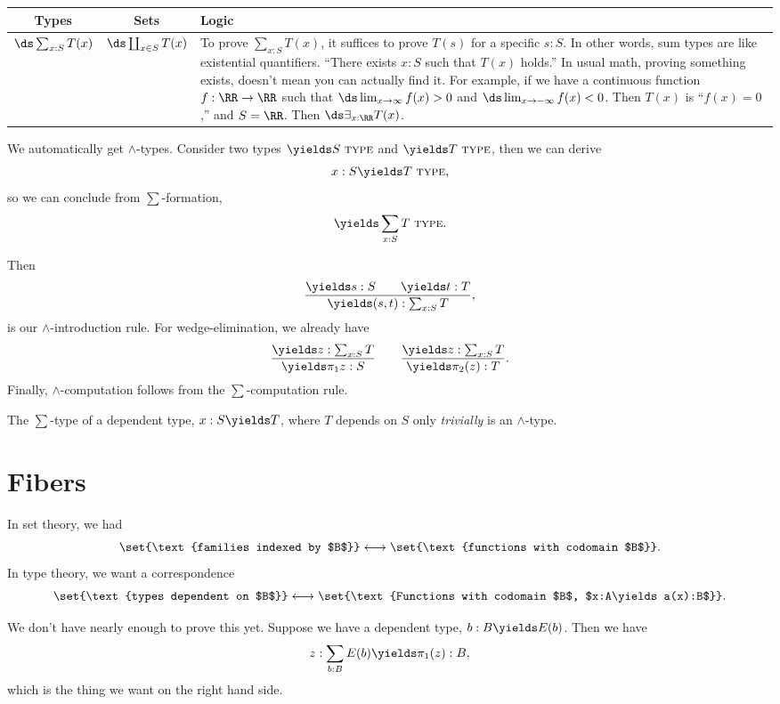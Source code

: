 \documentclass{article}
\newcommand\TYPE{\text{ \scshape{type}}}
\begin{document}
\begin{table}[h]
    \centering
    \begin{tabular}{ccp{9cm}}
        Types & Sets & Logic
        \\\toprule
        $\ds\sum_{x:S}T(x)$ 
        &
        $\ds\coprod_{x\in S} T(x)$
        &
        To prove 
        $\sum_{x:S}T(x)$, it suffices to prove 
        $T(s)$ for a specific $s:S$. In other words, 
        sum types are like existential quantifiers.
        ``There exists $x:S$ such that $T(x)$ holds.''
        In usual math, proving something exists,
        doesn't mean you can actually find it.
        For example, if we have a continuous function
        $f:\RR\to\RR$ such that $\ds\lim_{x\to\infty}f(x) >0$
        and $\ds\lim_{x\to-\infty} f(x) < 0$. Then $T(x)$ is 
        ``$f(x)=0$,'' and $S=\RR$. Then $\ds\exists_{x:\RR}T(x)$.
    \end{tabular}
\end{table}

We automatically get $\wedge$-types. Consider 
two types $\yields S\TYPE$ and $\yields T\TYPE$, 
then we can derive 
\[x:S\yields T\TYPE,\]
so we can conclude from $\sum$-formation,
\[\yields \sum_{x:S} T \TYPE.\]

Then 
\[\frac{\yields s:S\qquad \yields t:T}{
    \yields (s,t):\sum_{x:S} T
},\]
is our $\wedge$-introduction rule.
For wedge-elimination, we already have 
\[\frac{\yields z:\sum_{x:S}T}{\yields \pi_1z:S}
\qquad 
\frac{
    \yields z:\sum_{x:S}T
}{
    \yields \pi_2(z):T
}.
\]
Finally, $\wedge$-computation follows from 
the $\sum$-computation rule.

The $\sum$-type of a dependent type, $x:S\yields T$, where
$T$ depends on $S$ only \emph{trivially} is an $\wedge$-type.

\section{Fibers}

In set theory, we had 
\[\set{\text{families indexed by $B$}} \longleftrightarrow
\set{\text{functions with codomain $B$}}.
\]
In type theory, we want a correspondence
\[ \set{\text{types dependent on $B$}}
\longleftrightarrow \set{\text{Functions with codomain $B$, $x:A\yields a(x):B$}}.
\]

We don't have nearly enough to prove this yet. 
Suppose we have a dependent type, $b:B\yields E(b)$. Then we have 
\[z:\sum_{b:B}E(b) \yields \pi_1(z):B,\]
which is the thing we want on the right hand side.
\end{document}
